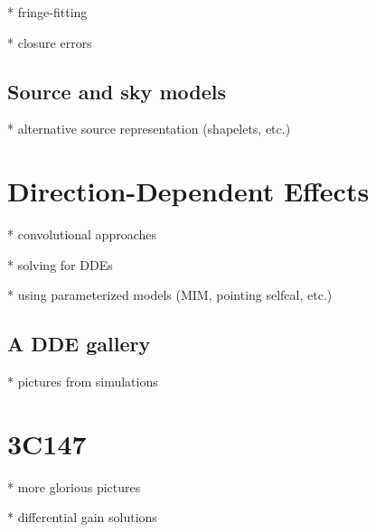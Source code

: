 \documentclass[]{aa}
\begin{document}
* fringe-fitting

* closure errors

\subsection{\label{sec:lsm}Source and sky models}

* alternative source representation (shapelets, etc.)



\section{\label{sec:ddes}Direction-Dependent Effects}

* convolutional approaches

* solving for DDEs

* using parameterized models (MIM, pointing selfcal, etc.)

\subsection{\label{sec:dde-examples}A DDE gallery}

* pictures from simulations

\section{\label{sec:3C147}3C147}

* more glorious pictures

* differential gain solutions




\end{document}

